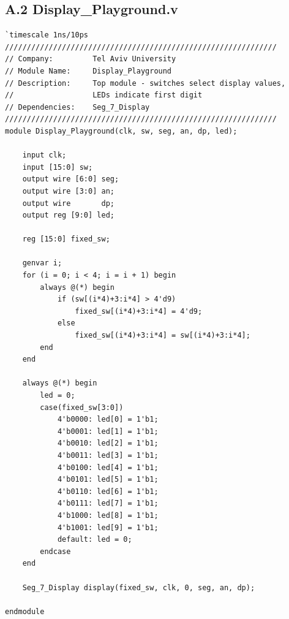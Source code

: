 \documentclass[12pt,a4paper]{article}
\begin{document}
\subsection*{A.2 Display\_Playground.v}
\begin{lstlisting}[style=verilog]
`timescale 1ns/10ps
//////////////////////////////////////////////////////////////
// Company:         Tel Aviv University
// Module Name:     Display_Playground
// Description:     Top module - switches select display values,
//                  LEDs indicate first digit
// Dependencies:    Seg_7_Display
//////////////////////////////////////////////////////////////
module Display_Playground(clk, sw, seg, an, dp, led);

    input clk;
    input [15:0] sw;
    output wire [6:0] seg;
    output wire [3:0] an;
    output wire       dp;
    output reg [9:0] led;

    reg [15:0] fixed_sw;

    genvar i;
    for (i = 0; i < 4; i = i + 1) begin
        always @(*) begin
            if (sw[(i*4)+3:i*4] > 4'd9)
                fixed_sw[(i*4)+3:i*4] = 4'd9;
            else
                fixed_sw[(i*4)+3:i*4] = sw[(i*4)+3:i*4];
        end
    end

    always @(*) begin
        led = 0;
        case(fixed_sw[3:0])
            4'b0000: led[0] = 1'b1;
            4'b0001: led[1] = 1'b1;
            4'b0010: led[2] = 1'b1;
            4'b0011: led[3] = 1'b1;
            4'b0100: led[4] = 1'b1;
            4'b0101: led[5] = 1'b1;
            4'b0110: led[6] = 1'b1;
            4'b0111: led[7] = 1'b1;
            4'b1000: led[8] = 1'b1;
            4'b1001: led[9] = 1'b1;
            default: led = 0;
        endcase
    end

    Seg_7_Display display(fixed_sw, clk, 0, seg, an, dp);

endmodule
\end{lstlisting}

\newpage
\end{document}
